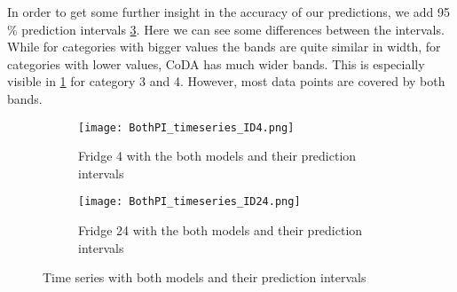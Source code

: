 In order to get some further insight in the accuracy of our predictions, we add 95 \% prediction intervals \ref{fig:TS BothPI}. Here we can see some differences between the intervals. While for categories with bigger values the bands are quite similar in width, for categories with lower values, CoDA has much wider bands. This is especially visible in \ref{fig:BothPI Fridge 4} for category 3 and 4. However, most data points are covered by both bands.
\begin{figure}[htb!]
\centering
\begin{subfigure}[b]{0.8\textwidth}
\texttt{[image: BothPI\_timeseries\_ID4.png]}
\caption{Fridge 4 with the both models and their prediction intervals}
\label{fig:BothPI Fridge 4}
\end{subfigure}
\hfill
\begin{subfigure}[b]{0.8\textwidth}
\texttt{[image: BothPI\_timeseries\_ID24.png]}
\caption{Fridge 24 with the both models and their prediction intervals}
\label{fig:BothPI Fridge 24}
\end{subfigure}
\caption{Time series with both models and their prediction intervals}
\label{fig:TS BothPI}
\end{figure}